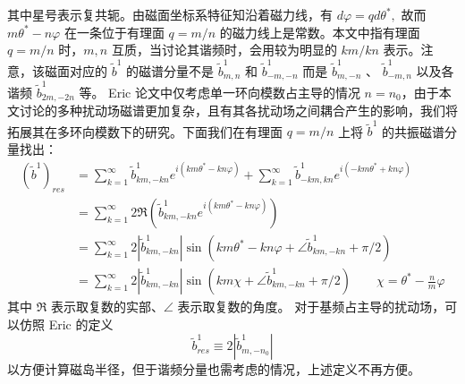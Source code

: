 其中星号表示复共轭。由磁面坐标系特征知沿着磁力线，有 $d \varphi=q d \theta^{*},$ 故而 $m \theta^{*}-n \varphi$ 在一条位于有理面 $q=m / n$ 的磁力线上是常数。本文中指有理面 $q=m/n$ 时，$m,n$ 互质，当讨论其谐频时，会用较为明显的 $km/kn$ 表示。注意，该磁面对应的 $\tilde{b}^{1}$ 的磁谱分量不是 $\tilde{b}_{m,n}^{1}$ 和 $\tilde{b}_{-m,-n}^{1}$ 而是 $\tilde{b}_{m,-n}^{1}$ 、 $\tilde{b}_{-m, n}^{1}$ 以及各谐频 $\tilde{b}_{2 m,-2 n}^{1}$ 等。 Eric\cite{nardon_edge_2007} 论文中仅考虑单一环向模数占主导的情况 $n=n_0$，由于本文讨论的多种扰动场磁谱更加复杂，且有其各扰动场之间耦合产生的影响，我们将拓展其在多环向模数下的研究。下面我们在有理面 $q=m/n$ 上将 $\tilde{b}^{1}$ 的共振磁谱分量找出：
\begin{equation}
  \label{eq:resonant-part-series}
\begin{aligned}
  \left(\tilde{b}^{1}\right)_{r e s} &=\sum_{k=1}^{\infty} \tilde{b}_{km,-kn}^{1} e^{i\left(km \theta^{*}-kn \varphi\right)}+ \sum_{k=1}^{\infty}  \tilde{b}_{-km, kn}^{1} e^{i\left(-km \theta^{*}+kn \varphi\right)} \\
  &= \sum_{k=1}^{\infty}  2 \Re\left(\tilde{b}_{km,-kn}^{1} e^{i\left(km \theta^{*}-kn \varphi\right)}\right) \\
  &=\sum_{k=1}^{\infty}  2\left|\tilde{b}_{km,-kn}^{1}\right| \sin \left(km \theta^{*}-kn\varphi + \angle\tilde{b}_{km,-kn}^{1} + \pi/2 \right)\\
  &=\sum_{k=1}^{\infty}  2\left|\tilde{b}_{km,-kn}^{1}\right| \sin \left(km\chi + \angle\tilde{b}_{km,-kn}^{1} + \pi/2 \right)\qquad \chi = \theta^*- \frac{n}{m} \varphi
  \end{aligned}
\end{equation}
其中 $\Re$ 表示取复数的实部、$\angle $ 表示取复数的角度。 对于基频占主导的扰动场，可以仿照 Eric \cite{nardon_edge_2007} 的定义
\begin{equation}
  \tilde{b}_{res}^{1} \equiv 2\left|\tilde{b}_{m,-n_{0}}^{1}\right|
\end{equation}
以方便计算磁岛半径，但于谐频分量也需考虑的情况，上述定义不再方便。


